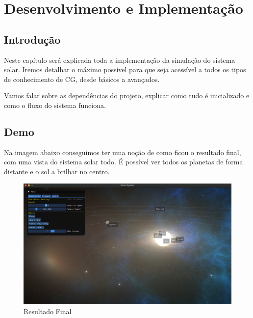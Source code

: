 \chapter{Desenvolvimento e Implementação}
\label{chap:estado-da-arte}

\section{Introdução}
\label{chap2:sec:intro}

\noindent
Neste capítulo será explicada toda a implementação da simulação do sistema solar. Iremos detalhar o máximo possível para que seja acessível a todos os tipos de conhecimento de \ac{CG}, desde básicos a avançados.

\noindent
Vamos falar sobre as dependências do projeto, explicar como tudo é inicializado e como o fluxo do sistema funciona.

\section{Demo}
\label{chap2:sec:demo}

\noindent
Na imagem abaixo conseguimos ter uma noção de como ficou o resultado final, com uma vista do sistema solar todo. É possível ver todos os planetas de forma distante e o sol a brilhar no centro.

\begin{figure}[h]
    \centering
    \includegraphics[width=400pt]{planets.png}
    \caption{Resultado Final}
\end{figure}

